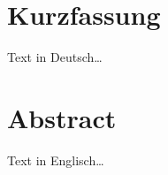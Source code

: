 \chapter*{Kurzfassung}\thispagestyle{empty}

Text in Deutsch\dots

\chapter*{Abstract}\thispagestyle{empty}

Text in Englisch\dots
